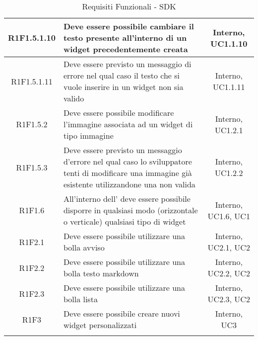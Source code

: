 \begin{longtable}{|c|>{\centering}m{7cm}|c|}
		\hline
		R1F1.5.1.10 & Deve essere possibile cambiare il testo presente all'interno di un widget precedentemente creata & Interno, UC1.1.10 \\
		\hline
		R1F1.5.1.11 & Deve essere previsto un messaggio di errore nel qual caso il testo che si vuole inserire in un widget non sia valido & Interno, UC1.1.11 \\
		\hline
		R1F1.5.2 & Deve essere possibile modificare l'immagine associata ad un widget di tipo immagine & Interno, UC1.2.1 \\
		\hline
		R1F1.5.3 & Deve essere previsto un messaggio d'errore nel qual caso lo sviluppatore tenti di modificare una immagine già esistente utilizzandone una non valida & Interno, UC1.2.2 \\
		\hline
		R1F1.6 & All'interno dell'\termine{SDK} deve essere possibile disporre in qualsiasi modo (orizzontale o verticale) qualsiasi tipo di widget & Interno, UC1.6, UC1 \\ 
			\hline
			R1F2.1 & Deve essere possibile utilizzare una bolla avviso & Interno, UC2.1, UC2 \\
			\hline
			R1F2.2 & Deve essere possibile utilizzare una bolla testo markdown & Interno, UC2.2, UC2 \\
			\hline
			R1F2.3 & Deve essere possibile utilizzare una bolla lista & Interno, UC2.3, UC2 \\
			\hline
			R1F3 & Deve essere possibile creare nuovi widget personalizzati & Interno, UC3 \\
			\hline
\caption[Requisiti Funzionali - SDK]{Requisiti Funzionali - SDK}
\label{tabella: Requisiti Funzionali - SDK}
\end{longtable}
\endgroup
\clearpage